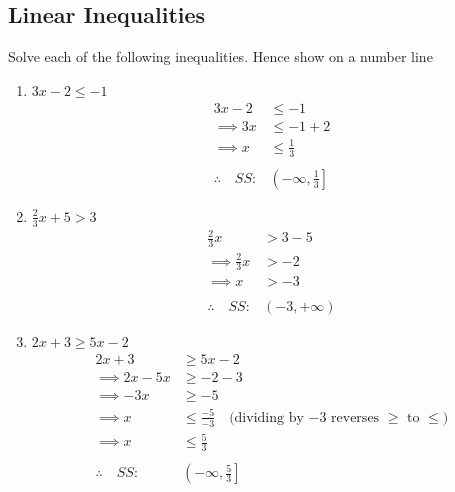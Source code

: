\documentclass[11pt,a4paper]{article}
\theoremstyle{definition}
\begin{document}
\subsection{Linear Inequalities}
Solve each of the following inequalities. Hence show on a number line
\begin{enumerate}
\item[(a).] $3x-2\leq -1$
\begin{align*}
3x-2 &\leq -1\\
\implies 3x & \leq -1+2\\
\implies x & \leq \frac{1}{3}\\\\
\therefore\quad  SS: & \left(-\infty,\frac{1}{3}\right]
\end{align*}




\begin{figure}[H]
\centering
{}
\end{figure}


\item[(b).] $\frac{2}{3}x+5>3$
\begin{align*}
\frac{2}{3}x &> 3-5\\
\implies \frac{2}{3}x & > -2\\
\implies x & > -3\\\\
\therefore \quad  SS:& (-3,+\infty)
\end{align*}



\begin{figure}[H]
\centering
{}
\end{figure}


\item[(c).] $2x+3\geq 5x-2$
\begin{align*}
2x+3 & \geq 5x-2\\
\implies 2x-5x & \geq -2-3\\
\implies -3x & \geq -5\\
\implies x & \leq \frac{-5}{-3} \quad \text{(dividing by $-3$ reverses $\geq$ to $\leq$)}\\
\implies x & \leq \frac{5}{3}\\\\
\therefore\quad  SS:& \left(-\infty,\frac{5}{3}\right]
\end{align*}




\end{enumerate}
\end{document}
